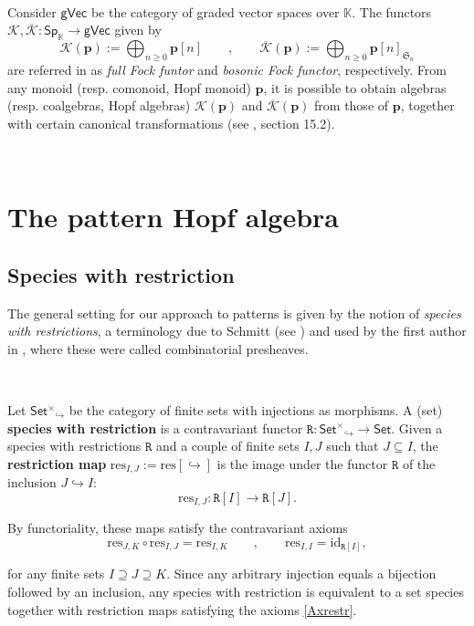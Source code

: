 \documentclass[12pt, reqno]{amsart}
\theoremstyle{definition}
\newcommand{\Fset}{\mathsf{Set^{\times}}}
\newcommand{\gVec}{\mathsf{gVec}}
\newcommand{\Set}{\mathsf{Set}}
\newcommand{\Ssk}{\mathsf{Sp}_\Kb} %
\newcommand{\Kb}{\mathbb{K}}
\newcommand{\prR}{\mathtt{R}}
\newcommand{\tp}{\mathbf{p}}
\newcommand{\Kc}{\mathcal{K}}
\newcommand{\Kcb}{\overline{\Kc}}
\begin{document}
\


Consider $\gVec$ be the category of graded vector spaces over $\mathbb{K}$. The functors $\Kc, \Kcb: \Ssk \to \gVec$ given by 
\begin{equation}
    \Kc(\tp):=\bigoplus_{n \geq 0}\tp[n] \qquad , \qquad \Kcb(\tp):= \bigoplus_{n \geq 0}\tp[n]_{\mathfrak{S}_n}
\end{equation}
are referred in \cite{AM2010} as \emph{full Fock funtor} and \emph{bosonic Fock functor}, respectively. From any monoid (resp. comonoid, Hopf monoid) $\tp$, it is possible to obtain algebras (resp. coalgebras, Hopf algebras) $\Kc(\tp)$ and $\Kcb(\tp)$ from those of $\tp$, together with certain canonical transformations (see \cite{AM2010}, section 15.2).

\

\section{The pattern Hopf algebra \label{sec:pattern_algebra_contruction}}

\subsection{Species with restriction}
The general setting for our approach to patterns is given by the notion of \emph{species with restrictions}, a terminology due to Schmitt (see \cite{Schmitt1993}) and used by the first author in \cite{Penaguiao2020}, where these were called combinatorial presheaves.

\

Let $\Fset_{\!\!\!\!\!\hookrightarrow}$ be the category of finite sets with injections as morphisms. A (set) {\bf species with restriction} is a contravariant functor $\prR:\Fset_{\!\!\!\!\!\hookrightarrow} \to \Set$. Given a species with restrictions $\prR$ and a couple of finite sets $I,J$ such that $J \subseteq I$, the {\bf restriction map} $\text{res}_{I,J}:=\text{res}[\hookrightarrow]$ is the image under the functor $\prR$ of the inclusion $J \hookrightarrow I$:
\[\text{res}_{I,J}: \prR[I]\to \prR[J].\]

By functoriality, these maps satisfy the contravariant axioms
\begin{equation}\label{Axrestr}
    \text{res}_{J,K}\circ\text{res}_{I,J}=\text{res}_{I,K} \qquad , \qquad \text{res}_{I,I}=\text{id}_{\prR[I]},
\end{equation}

for any finite sets $I \supseteq J \supseteq K$. 
Since any arbitrary injection equals a bijection followed by an inclusion, any species with restriction is equivalent to a set species together with restriction maps satisfying the axioms \eqref{Axrestr}.
\end{document}
